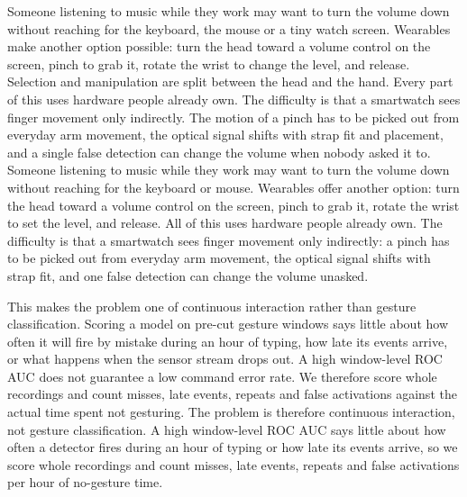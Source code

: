 
\label{introduction}

\iffull
Someone listening to music while they work may want to turn the volume down without reaching for the keyboard, the mouse or a tiny watch screen. Wearables make another option possible: turn the head toward a volume control on the screen, pinch to grab it, rotate the wrist to change the level, and release. Selection and manipulation are split between the head and the hand. Every part of this uses hardware people already own. The difficulty is that a smartwatch sees finger movement only indirectly. The motion of a pinch has to be picked out from everyday arm movement, the optical signal shifts with strap fit and placement, and a single false detection can change the volume when nobody asked it to.
\else
Someone listening to music while they work may want to turn the volume down without reaching for the keyboard or mouse. Wearables offer another option: turn the head toward a volume control on the screen, pinch to grab it, rotate the wrist to set the level, and release. All of this uses hardware people already own. The difficulty is that a smartwatch sees finger movement only indirectly: a pinch has to be picked out from everyday arm movement, the optical signal shifts with strap fit, and one false detection can change the volume unasked.
\fi

\iffull
This makes the problem one of continuous interaction rather than gesture classification. Scoring a model on pre-cut gesture windows says little about how often it will fire by mistake during an hour of typing, how late its events arrive, or what happens when the sensor stream drops out. A high window-level ROC AUC does not guarantee a low command error rate. We therefore score whole recordings and count misses, late events, repeats and false activations against the actual time spent not gesturing.
\else
The problem is therefore continuous interaction, not gesture classification. A high window-level ROC AUC says little about how often a detector fires during an hour of typing or how late its events arrive, so we score whole recordings and count misses, late events, repeats and false activations per hour of no-gesture time.
\fi

